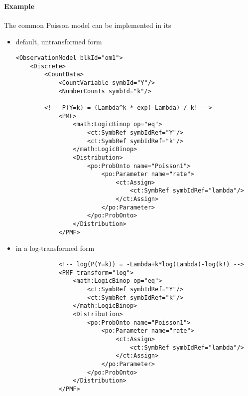 \paragraph{Example}
The common Poisson model can be implemented in its 
\begin{itemize}
\item 
default, untransformed form
\lstset{language=XML}
\begin{lstlisting}
<ObservationModel blkId="om1">
    <Discrete>
        <CountData>
            <CountVariable symbId="Y"/>
            <NumberCounts symbId="k"/>
            
	    <!-- P(Y=k) = (Lambda^k * exp(-Lambda) / k! -->
            <PMF>
                <math:LogicBinop op="eq">
                    <ct:SymbRef symbIdRef="Y"/>
                    <ct:SymbRef symbIdRef="k"/>
                </math:LogicBinop>
                <Distribution>
                    <po:ProbOnto name="Poisson1">
                        <po:Parameter name="rate">
                            <ct:Assign>
                                <ct:SymbRef symbIdRef="lambda"/>
                            </ct:Assign>
                        </po:Parameter>
                    </po:ProbOnto>
                </Distribution>
            </PMF>
\end{lstlisting}

\item 
in a log-transformed form
\lstset{language=XML}
\begin{lstlisting}
            <!-- log(P(Y=k)) = -Lambda+k*log(Lambda)-log(k!) -->
            <PMF transform="log">
                <math:LogicBinop op="eq">
                    <ct:SymbRef symbIdRef="Y"/>
                    <ct:SymbRef symbIdRef="k"/>
                </math:LogicBinop>
                <Distribution>
                    <po:ProbOnto name="Poisson1">
                        <po:Parameter name="rate">
                            <ct:Assign>
                                <ct:SymbRef symbIdRef="lambda"/>
                            </ct:Assign>
                        </po:Parameter>
                    </po:ProbOnto>
                </Distribution>
            </PMF>
\end{lstlisting}


\end{itemize}
